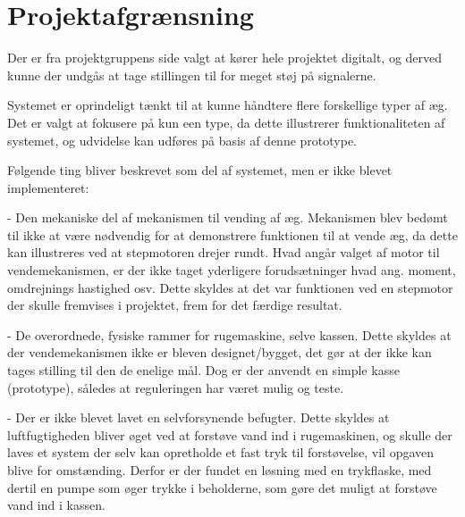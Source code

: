 \chapter{Projektafgrænsning}



Der er fra projektgruppens side valgt at kører hele projektet digitalt, og derved kunne der undgås at tage stillingen til for meget støj på signalerne. 

Systemet er oprindeligt tænkt til at kunne håndtere flere forskellige typer af æg. Det er valgt at fokusere på kun een type, da dette illustrerer funktionaliteten af systemet, og udvidelse kan udføres på basis af denne prototype.

Følgende ting bliver beskrevet som del af systemet, men er ikke blevet implementeret:

- Den mekaniske del af mekanismen til vending af æg. Mekanismen blev bedømt til ikke at være nødvendig for at demonstrere funktionen til at vende æg, da dette kan illustreres ved at stepmotoren drejer rundt. Hvad angår valget af motor til vendemekanismen, er der ikke taget yderligere forudsætninger hvad ang. moment, omdrejnings hastighed osv. Dette skyldes at det var funktionen ved en stepmotor der skulle fremvises i projektet, frem for det færdige resultat.

- De overordnede, fysiske rammer for rugemaskine, selve kassen. Dette skyldes at der vendemekanismen ikke er bleven designet/bygget, det gør at der ikke kan tages stilling til den de enelige mål. Dog er der anvendt en simple kasse (prototype), således at reguleringen har været mulig og teste. 

- Der er ikke blevet lavet en selvforsynende befugter. Dette skyldes at luftfugtigheden bliver øget ved at forstøve vand ind i rugemaskinen, og skulle der laves et system der selv kan opretholde et fast tryk til forstøvelse, vil opgaven blive for omstænding. Derfor er der fundet en løsning med en trykflaske, med dertil en pumpe som øger trykke i beholderne, som gøre det muligt at forstøve vand ind i kassen.

